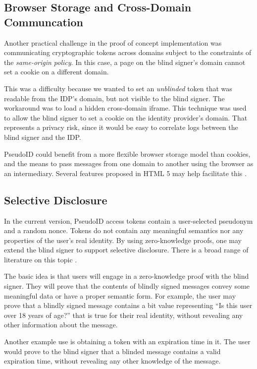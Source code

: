 \documentclass{llncs}
\begin{document}
\subsection{Browser Storage and Cross-Domain Communcation}

Another practical challenge in the proof of concept implementation was
communicating cryptographic tokens across domains subject to the
constraints of the \emph{same-origin policy}. In this case, a page on
the blind signer's domain cannot set a cookie on a different domain.

This was a difficulty because we wanted to set an \textit{unblinded}
token that was readable from the IDP's domain, but not visible to the
blind signer. The workaround was to load a hidden cross-domain
iframe. This technique was used to allow the blind signer to set a
cookie on the identity provider's domain. That represents a privacy
risk, since it would be easy to correlate logs between the blind
signer and the IDP.

PseudoID could benefit from a more flexible browser storage model than
cookies, and the means to pass messages from one domain to another
using the browser as an intermediary. Several features proposed in
HTML 5 may help facilitate this \cite{HTML5}.

\subsection{Selective Disclosure}

In the current version, PseudoID access tokens contain a user-selected
pseudonym and a random nonce. Tokens do not contain any meaningful
semantics nor any properties of the user's real identity. By using
zero-knowledge proofs, one may extend the blind signer to support
selective disclosure. There is a broad range of literature on this
topic \cite{Cha85,CaLy01,CaLy04,CHL05,CaGr08}.

The basic idea is that users will engage in a zero-knowledge proof
with the blind signer. They will prove that the contents of
blindly signed messages convey some meaningful data or have a proper
semantic form. For example, the user may prove that a blindly signed
message contains a bit value representing ``Is this user over 18 years
of age?'' that is true for their real identity, without revealing any
other information about the message.

Another example use is obtaining a token with an expiration time in
it. The user would prove to the blind signer that a blinded message
contains a valid expiration time, without revealing any other
knowledge of the message.
\end{document}
